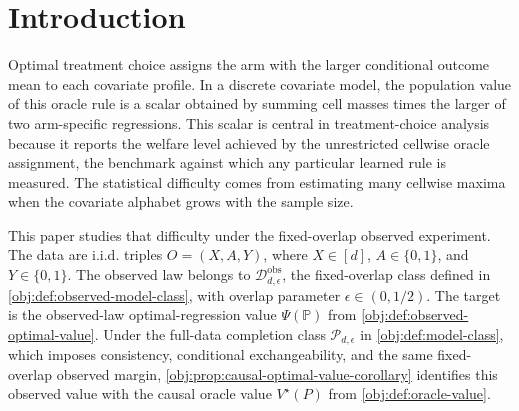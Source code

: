 \begin{abstract}
This paper characterizes the finite-sample minimax risk for estimating the scalar optimal-treatment value with a binary treatment, binary outcome, and a discrete covariate alphabet of size \(d\). Under consistency, conditional exchangeability, i.i.d. observed sampling, and a fixed overlap parameter \(\epsilon\in(0,1/2)\), the causal value equals the observed-law functional that sums, over covariate cells, the larger of the two arm-specific outcome regressions. For sample size \(n\), the fixed-sample minimax squared risk satisfies
\[
\mathfrak R_{n,d,\epsilon}
\asymp_\epsilon
\min\left\{1,\frac{d}{n\log(ed)}\right\}.
\]
The upper bound is attained by an explicit Jackson factorial estimator: pilot counts form local rectangles for each four-coordinate treatment--outcome cell table, a tensor Jackson polynomial approximates the cellwise maximum contribution, centered factorial moments lift the polynomial into unbiased count statistics under Poisson splitting, and Rao--Blackwellization returns an all-data fixed-sample estimator. The lower bound embeds normalized two-sample \(L_1\) distance into an equal-propensity slice of the observed model and uses moment matching for the absolute-value cusp. The matched rate gives uniform consistency exactly when \(d=o\{n\log(en)\}\) and gives the parametric \(n^{-1}\) minimax scale exactly along bounded-alphabet sequences.
\end{abstract}

\section{Introduction}

Optimal treatment choice assigns the arm with the larger conditional outcome mean to each covariate profile. In a discrete covariate model, the population value of this oracle rule is a scalar obtained by summing cell masses times the larger of two arm-specific regressions. This scalar is central in treatment-choice analysis because it reports the welfare level achieved by the unrestricted cellwise oracle assignment, the benchmark against which any particular learned rule is measured. The statistical difficulty comes from estimating many cellwise maxima when the covariate alphabet grows with the sample size.

This paper studies that difficulty under the fixed-overlap observed experiment. The data are i.i.d. triples \(O=(X,A,Y)\), where \(X\in[d]\), \(A\in\{0,1\}\), and \(Y\in\{0,1\}\). The observed law belongs to \(\mathcal D_{d,\epsilon}^{\mathrm{obs}}\), the fixed-overlap class defined in \cref{obj:def:observed-model-class}, with overlap parameter \(\epsilon\in(0,1/2)\). The target is the observed-law optimal-regression value \(\Psi(\mathbb P)\) from \cref{obj:def:observed-optimal-value}. Under the full-data completion class \(\mathcal P_{d,\epsilon}\) in \cref{obj:def:model-class}, which imposes consistency, conditional exchangeability, and the same fixed-overlap observed margin, \cref{obj:prop:causal-optimal-value-corollary} identifies this observed value with the causal oracle value \(V^\star(P)\) from \cref{obj:def:oracle-value}.

